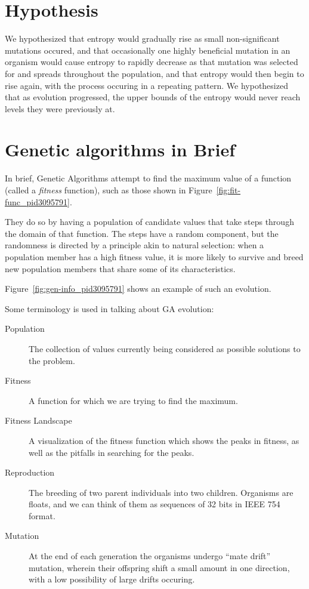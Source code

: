 \documentclass[11pt]{article}
\begin{document}
\section{Hypothesis}

We hypothesized that entropy would gradually rise as small
non-significant mutations occured, and that occasionally one highly
beneficial mutation in an organism would cause entropy to rapidly
decrease as that mutation was selected for and spreads throughout the
population, and that entropy would then begin to rise again, with the process occuring in a
repeating pattern. We hypothesized that as evolution progressed, the upper
bounds of the entropy would never reach levels they were previously
at.


\section{Genetic algorithms in Brief}

In brief, Genetic Algorithms attempt to find the maximum value of a
function (called a \emph{fitness} function), such as those shown in
Figure~\ref{fig:fit-func_pid3095791}.

They do so by having a population of candidate values that take steps
through the domain of that function.  The steps have a random
component, but the randomness is directed by a principle akin to
natural selection: when a population member has a high fitness value,
it is more likely to survive and breed new population members that
share some of its characteristics.

Figure~\ref{fig:gen-info_pid3095791} shows an example of such an
evolution.

Some terminology is used in talking about GA evolution:

\begin{description}
\item[Population] The collection of values currently being considered
  as possible solutions to the problem.
\item[Fitness] A function for which we are trying to find the maximum.
\item[Fitness Landscape] A visualization of the fitness function which
  shows the peaks in fitness, as well as the pitfalls in searching for
  the peaks.
\item[Reproduction] The breeding of two parent individuals into two
  children. Organisms are floats, and we can think of them as
  sequences of 32 bits in IEEE 754 format.
\item[Mutation] At the end of each generation the organisms undergo
  ``mate drift'' mutation, wherein their offspring shift a small amount
  in one direction, with a low possibility of large drifts occuring.
\end{description}
\end{document}
